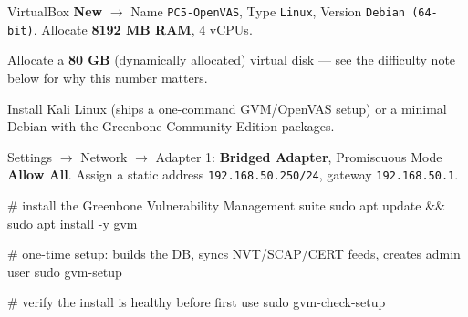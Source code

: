 \documentclass[11pt,a4paper]{article}
\begin{document}
\begin{steps}
\item VirtualBox \textbf{New} $\to$ Name \texttt{PC5-OpenVAS}, Type \texttt{Linux},
  Version \texttt{Debian (64-bit)}. Allocate \textbf{8192 MB RAM}, 4 vCPUs.
\item Allocate a \textbf{80 GB} (dynamically allocated) virtual disk --- see the
  difficulty note below for why this number matters.
\item Install Kali Linux (ships a one-command GVM/OpenVAS setup) or a minimal Debian
  with the Greenbone Community Edition packages.
\item Settings $\to$ Network $\to$ Adapter 1: \textbf{Bridged Adapter}, Promiscuous
  Mode \textbf{Allow All}. Assign a static address \texttt{192.168.50.250/24}, gateway
  \texttt{192.168.50.1}.
\end{steps}

\begin{cmdbox}
\begin{cmdverb}
# install the Greenbone Vulnerability Management suite
sudo apt update && sudo apt install -y gvm

# one-time setup: builds the DB, syncs NVT/SCAP/CERT feeds, creates admin user
sudo gvm-setup

# verify the install is healthy before first use
sudo gvm-check-setup
\end{cmdverb}
\end{cmdbox}
\end{document}
